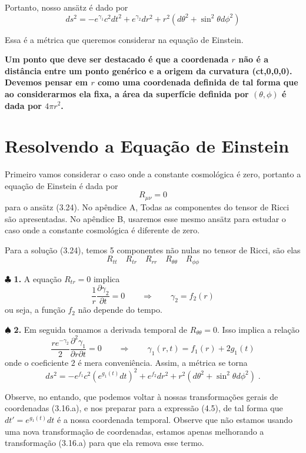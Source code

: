 \documentclass[11pt]{article}
\begin{document}
Portanto, nosso ansätz é dado por
\[ \tag{3.24} \boxed{ds^2 = - e^{\gamma_1} c^2 dt^2 + e^{\gamma_2}dr^2 + r^2 (d\theta^2 + \sin^2\theta d\phi^2)}\]

Essa é a métrica que queremos considerar na equação de Einstein.

\textbf{Um ponto que deve ser destacado é que a coordenada \(r\) não é a
distância entre um ponto genérico e a origem da curvatura (ct,0,0,0).
Devemos pensar em \(r\) como uma coordenada definida de tal forma que ao
considerarmos ela fixa, a área da superfície definida por
\((\theta, \phi)\) é dada por \(4 \pi r^2\).}

    \hypertarget{resolvendo-a-equauxe7uxe3o-de-einstein}{%
\section{Resolvendo a Equação de
Einstein}\label{resolvendo-a-equauxe7uxe3o-de-einstein}}

    Primeiro vamos considerar o caso onde a constante cosmológica é zero,
portanto a equação de Einstein é dada por \[ \tag{4.1} R_{\mu\nu} = 0 \]
para o ansätz (3.24). No apêndice A, Todas as componentes do tensor de
Ricci são apresentadas. No apêndice B, usaremos esse mesmo ansätz para
estudar o caso onde a constante cosmológica é diferente de zero.

    Para a solução (3.24), temos 5 componentes não nulas no tensor de Ricci,
são elas
\[\tag{4.2} R_{tt}\quad R_{tr}\quad R_{rr}\quad R_{\theta\theta} \quad R_{\phi\phi}\]

    \(\clubsuit\) \textbf{1.} A equação \(R_{tr} = 0\) implica
\[\tag{4.3} \frac{1}{r}\frac{\partial \gamma_2}{\partial t} = 0 \qquad \Rightarrow \qquad \gamma_2=f_2(r)\]
ou seja, a função \(f_2\) não depende do tempo.

    \(\spadesuit\) \textbf{2.} Em seguida tomamos a derivada temporal de
\(R_{\theta\theta} = 0\). Isso implica a relação
\[\tag{4.4} \frac{r e^{-\gamma_2}}{2}\frac{\partial^2 \gamma_1}{\partial r \partial t} = 0 \qquad \Rightarrow \qquad \gamma_1(r,t)=f_1(r) + 2g_1(t)\]
onde o coeficiente \(2\) é mera conveniência. Assim, a métrica se torna
\[ \tag{4.5} ds^2 = - e^{f_1} c^2 (e^{g_1(t)}dt)^2 + e^{f_2}dr^2 + r^2 (d\theta^2 + \sin^2\theta d\phi^2)\; .\]

Observe, no entando, que podemos voltar à nossas transformações gerais
de coordenadas (3.16.a), e nos preparar para a expressão (4.5), de tal
forma que \(dt' = e^{g_1(t)}dt\) é a nossa coordenada temporal. Observe
que não estamos usando uma nova transformação de coordenadas, estamos
apenas melhorando a transformação (3.16.a) para que ela remova esse
termo.
\end{document}
